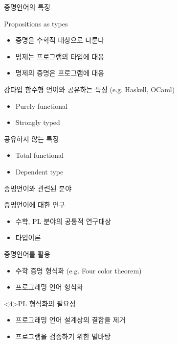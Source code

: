 \documentclass{beamer}
\begin{document}
\begin{frame}{증명언어의 특징}

  \begin{block} {Propositions as types}
    \begin{itemize}
      \item 증명을 수학적 대상으로 다룬다
      \item 명제는 프로그램의 타입에 대응
      \item 명제의 증명은 프로그램에 대응
    \end{itemize}
  \end{block}

  \pause
  \begin{block} {강타입 함수형 언어와 공유하는 특징 (e.g. Haskell, OCaml)}
    \begin{itemize}
      \item Purely functional
      \item Strongly typed
    \end{itemize}
  \end{block}

  \pause
  \begin{block} {공유하지 않는 특징}
    \begin{itemize}
      \item Total functional
      \item Dependent type
    \end{itemize}
  \end{block}

\end{frame}

\begin{frame}{증명언어와 관련된 분야}

  \begin{block}{증명언어에 대한 연구}
    \begin{itemize}
      \item 수학, PL 분야의 공통적 연구대상
      \item 타입이론
    \end{itemize}
  \end{block}

  \pause
  \begin{block}{증명언어를 활용}
    \begin{itemize}
      \item 수학 증명 형식화 \alert<3>{(e.g. Four color theorem)}
      \item 프로그래밍 언어 형식화
    \end{itemize}
  \end{block}

  \begin{block}<4>{PL 형식화의 필요성}
    \begin{itemize}
      \item 프로그래밍 언어 설계상의 결함을 제거
      \item 프로그램을 검증하기 위한 밑바탕
    \end{itemize}
  \end{block}
\end{frame}
\end{document}
